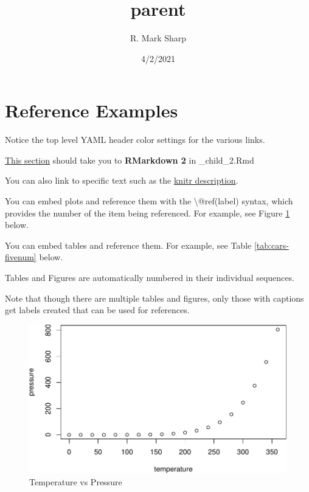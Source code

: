 \documentclass[
]{article}
\title{parent}
\author{R. Mark Sharp}
\date{4/2/2021}
\begin{document}
\maketitle

{
\hypersetup{linkcolor=}
\setcounter{tocdepth}{2}
\tableofcontents
}
\hypertarget{reference-examples}{%
\section{Reference Examples}\label{reference-examples}}

Notice the top level YAML header color settings for the various links.

\protect\hyperlink{rmarkdown-2}{This section} should take you to \textbf{RMarkdown 2} in \_child\_2.Rmd

You can also link to specific text such as the
\protect\hyperlink{knitr-description}{knitr description}.

You can embed plots and reference them with the \textbackslash{}@ref(label) syntax, which
provides the number of the item being referenced. For example, see
Figure \ref{fig:pressure} below.

You can embed tables and reference them. For example, see Table
\ref{tab:cars-fivenum} below.

Tables and Figures are automatically numbered in their individual sequences.

Note that though there are multiple tables and figures, only those with
captions get labels created that can be used for references.

\begin{figure}
\centering
\includegraphics{parent_files/figure-latex/pressure-1.pdf}
\caption{\label{fig:pressure}Temperature vs Pressure}
\end{figure}
\end{document}
